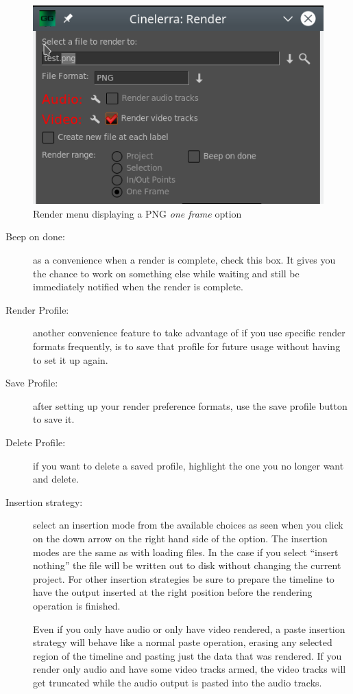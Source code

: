 \begin{figure}[htpb]
    \centering
    \includegraphics[width=0.7\linewidth]{images/render02.png}
    \caption{Render menu displaying a PNG \textit{one frame} option}
    \label{fig:render02}
\end{figure}

\begin{description}
    \item[Beep on done:] as a convenience when a render is complete, check this box.  It gives you the chance to work on something else while waiting and still be immediately notified when the render is complete.
    \item[Render Profile:] another convenience feature to take advantage of if you use specific render formats
    frequently, is to save that profile for future usage without having to set it up again.
    \item[Save Profile:] after setting up your render preference formats, use the save profile button to save it.
    \item[Delete Profile:] if you want to delete a saved profile, highlight the one you no longer want and delete.
    \item[Insertion strategy:] select an insertion mode from the available choices as seen when you click on the down arrow on the right hand side of the option. The insertion modes are the same as with loading files.  In the case if you select “insert nothing” the file will be written out to disk without changing the current project. For other insertion strategies be sure to prepare the timeline to have the output inserted at the right position before the rendering operation is finished. 
    
    Even if you only have audio or only have video rendered, a paste insertion strategy will behave like a normal paste operation, erasing any selected region of the timeline and pasting just the data that was rendered.  If you render only audio and have some video tracks armed, the video tracks will get truncated while the audio output is pasted into the audio tracks.
\end{description}

